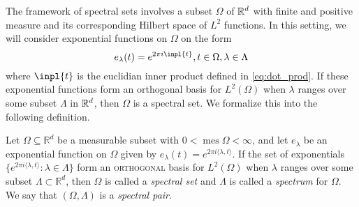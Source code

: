 \documentclass[../thesis.tex]{subfiles}
\begin{document}







The framework of spectral sets involves a subset $\Omega$ of $\mathbb{R}^d$ with finite and positive measure and its corresponding Hilbert space of $L^2$ functions. In this setting, we will consider exponential functions on $\Omega$ on the form 
\begin{equation}\label{eq:exp}
    e_{\lambda}(t) = e^{2 \pi i \inpl{t}}, t\in \Omega, \lambda \in \Lambda
\end{equation}
where $\inpl{t}$ is the euclidian inner product defined in \cref{eq:dot_prod}. If these exponential functions form an orthogonal basis for $L^2(\Omega)$ when $\lambda$ ranges over some subset $\Lambda$ in $\mathbb{R}^d$, then $\Omega$ is a spectral set. We formalize this into the following definition.

\begin{definition} \label{def:spectral_set}
    Let $\Omega \subseteq \mathbb{R}^d$ be a measurable subset with $0< \operatorname{mes} \Omega < \infty$, and let $e_{\lambda}$ be an exponential function on $\Omega$ given by $e_{\lambda}(t) = e^{2\pi i \langle \lambda,t  \rangle }$. If the set of exponentials $\{ e^{2\pi i \langle \lambda,t  \rangle } : \lambda \in \Lambda\}$  form an \textsc{orthogonal} basis for $L^2 (\Omega)$ when $\lambda$ ranges over some subset $\Lambda \subset \mathbb{R}^d$, then $\Omega$ is called a \emph{spectral set} and $\Lambda$ is called a \emph{spectrum} for $\Omega$. We say that $(\Omega, \Lambda)$ is a \emph{spectral pair}. 
\end{definition}
\end{document}
